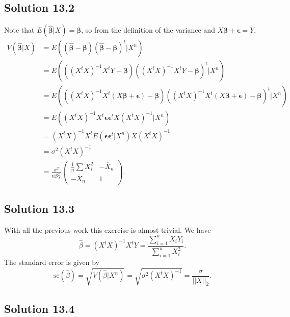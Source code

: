 \subsection*{Solution 13.2}

Note that $E(\hat{\bm{\beta}}|X) = \bm{\beta}$, so from the definition of the variance and $X\bm{\beta} + \bm{\epsilon} = Y$,
\begin{equation*}
    \begin{split}
        V(\hat{\bm{\beta}}|X)
            &= E((\hat{\bm{\beta}} - \bm{\beta})(\hat{\bm{\beta}} - \bm{\beta})^t|X^n) \\
            &= E(((X^tX)^{-1}X^tY - \bm{\beta})((X^tX)^{-1}X^tY - \bm{\beta})^t|X^n) \\
            &= E(((X^tX)^{-1}X^t(X\bm{\beta} + \bm{\epsilon}) - \bm{\beta})((X^tX)^{-1}X^t(X\bm{\beta} + \bm{\epsilon}) - \bm{\beta})^t|X^n) \\
            &= E((X^tX)^{-1}X^t \bm{\epsilon}\bm{\epsilon}^t X(X^tX)^{-1}|X^n) \\
            &= (X^tX)^{-1}X^t E(\bm{\epsilon}\bm{\epsilon}^t|X^n) X(X^tX)^{-1} \\
            &= \sigma^2 (X^tX)^{-1} \\
            &= \frac{\sigma^2}{n S_X^2} \begin{pmatrix}
                \frac{1}{n}\sum X_i^2 & -\overline{X}_n \\
                -\overline{X}_n & 1
            \end{pmatrix}.
    \end{split}
\end{equation*}


\subsection*{Solution 13.3}

With all the previous work this exercise is almost trivial.
We have
\begin{equation*}
    \hat{\beta} = (X^tX)^{-1}X^tY
        = \frac{\sum_{i = 1}^n X_i Y_i}{\sum_{i = 1}^n X_i^2}.
\end{equation*}
The standard error is given by
\begin{equation*}
    \mathrm{se}(\hat{\beta})
        = \sqrt{V(\hat{\beta}|X^n)}
        = \sqrt{\sigma^2(X^tX)^{-1}}
        = \frac{\sigma}{||X||_2}.
\end{equation*}


\subsection*{Solution 13.4}


